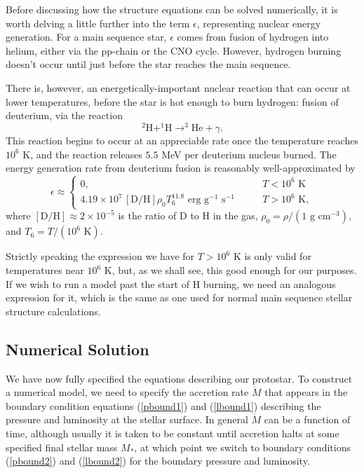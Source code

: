 Before discussing how the structure equations can be solved numerically, it is worth delving a little further into the term $\epsilon$, representing nuclear energy generation. For a main sequence star, $\epsilon$ comes from fusion of hydrogen into helium, either via the pp-chain or the CNO cycle. However, hydrogen burning doesn't occur until just before the star reaches the main sequence.

There is, however, an energetically-important nuclear reaction that can occur at lower temperatures, before the star is hot enough to burn hydrogen: fusion of deuterium, via the reaction
\begin{equation}
^2\mbox{H} + ^1\mbox{H} \rightarrow ^3\mbox{He} + \gamma.
\end{equation}
This reaction begins to occur at an appreciable rate once the temperature reaches $10^6$ K, and the reaction releases $5.5$ MeV per deuterium nucleus burned. The energy generation rate from deuterium fusion is reasonably well-approximated by
\begin{equation}
\epsilon \approx 
\left\{
\begin{array}{ll}
0, & T < 10^6\mbox{ K} \\
4.19\times 10^7\, [\mbox{D}/\mbox{H}] \rho_0 T_6^{11.8} \mbox{ erg g}^{-1}\mbox{ s}^{-1}
\qquad & T > 10^6\mbox{ K},
\end{array}
\right.
\end{equation}
where $[\mbox{D}/\mbox{H}]\approx 2\times 10^{-5}$ is the ratio of D to H in the gas, $\rho_0=\rho/(1\mbox{ g cm}^{-3})$, and $T_6=T/(10^6\mbox{ K})$.

Strictly speaking the expression we have for $T>10^6$ K is only valid for temperatures near $10^6$ K, but, as we shall see, this good enough for our purposes. If we wish to run a model past the start of H burning, we need an analogous expression for it, which is the same as one used for normal main sequence stellar structure calculations.

\subsection{Numerical Solution}

We have now fully specified the equations describing our protostar. To construct a numerical model, we need to specify the accretion rate $\dot{M}$ that appears in the boundary condition equations (\ref{pbound1}) and (\ref{lbound1}) describing the pressure and luminosity at the stellar surface. In general $\dot{M}$ can be a function of time, although usually it is taken to be constant until accretion halts at some specified final stellar mass $M_*$, at which point we switch to boundary conditions (\ref{pbound2}) and (\ref{lbound2}) for the boundary pressure and luminosity.

